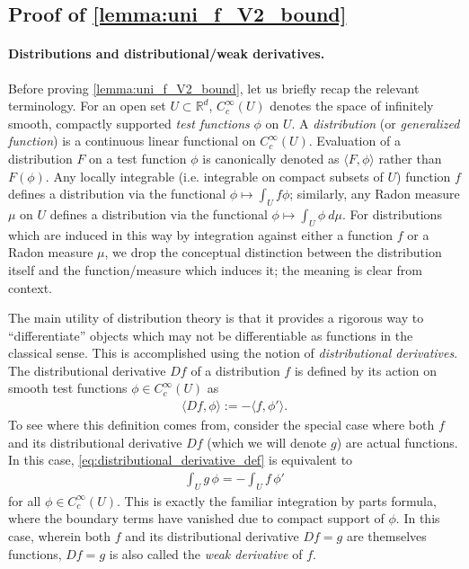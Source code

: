 \documentclass{article}
\newcommand{\R}{\mathbb{R}}
\begin{document}
\begin{appendices}
\subsection{Proof of \cref{lemma:uni_f_V2_bound}}
\label{appendix:proof_uni_f_V2_bound}
\paragraph{Distributions and distributional/weak derivatives.} Before proving \cref{lemma:uni_f_V2_bound}, let us briefly recap the relevant terminology. For an open set $U \subset \R^d$, $C_c^\infty(U)$ denotes the space of infinitely smooth, compactly supported \textit{test functions} $\phi$ on $U$. A \textit{distribution} (or \textit{generalized function}) is a continuous linear functional on $C_c^\infty(U)$. Evaluation of a distribution $F$ on a test function $\phi$ is canonically denoted as $\langle F, \phi \rangle$ rather than $F(\phi)$. Any locally integrable (i.e. integrable on compact subsets of $U$) function $f$ defines a distribution via the functional $\phi \mapsto \int_U f \phi$; similarly, any Radon measure $\mu$ on $U$ defines a distribution via the functional $\phi \mapsto \int_U \phi \ d \mu$. For distributions which are induced in this way by integration against either a function $f$ or a Radon measure $\mu$, we drop the conceptual distinction between the distribution itself and the function/measure which induces it; the meaning is clear from context.

The main utility of distribution theory is that it provides a rigorous way to ``differentiate'' objects which may not be differentiable as functions in the classical sense. This is accomplished using the notion of \textit{distributional derivatives}. The distributional derivative $Df$ of a distribution $f$ is defined by its action on smooth test functions $\phi \in C_c^\infty(U)$ as
\begin{align} \label{eq:distributional_derivative_def}
    \langle Df,\phi\rangle := - \langle f,\phi'\rangle .
\end{align}
To see where this definition comes from, consider the special case where both $f$ and its distributional derivative $Df$ (which we will denote $g$) are actual functions. In this case, \eqref{eq:distributional_derivative_def} is equivalent to
\begin{align}
    \int_U g \,\phi = -\int_U f\,\phi'
\end{align}
for all $\phi \in C_c^\infty(U)$. This is exactly the familiar integration by parts formula, where the boundary terms have vanished due to compact support of $\phi$. In this case, wherein both $f$ and its distributional derivative $Df = g$ are themselves functions, $Df = g$ is also called the \textit{weak derivative} of $f$.


\end{appendices}
\end{document}
